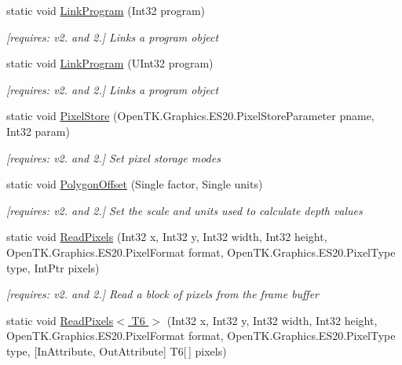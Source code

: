 \begin{DoxyCompactItemize}
static void \hyperlink{class_open_t_k_1_1_graphics_1_1_e_s20_1_1_g_l_a1c1b528b362544b485be4c741345638d}{Link\-Program} (Int32 program)
\begin{DoxyCompactList}\small\item\em \mbox{[}requires\-: v2. and 2.\mbox{]} Links a program object \end{DoxyCompactList}\item 
static void \hyperlink{class_open_t_k_1_1_graphics_1_1_e_s20_1_1_g_l_a133e0f78fdeb9901fceadc28635661be}{Link\-Program} (U\-Int32 program)
\begin{DoxyCompactList}\small\item\em \mbox{[}requires\-: v2. and 2.\mbox{]} Links a program object \end{DoxyCompactList}\item 
static void \hyperlink{class_open_t_k_1_1_graphics_1_1_e_s20_1_1_g_l_a249cdec32fb961d0bec2ab4993d53658}{Pixel\-Store} (Open\-T\-K.\-Graphics.\-E\-S20.\-Pixel\-Store\-Parameter pname, Int32 param)
\begin{DoxyCompactList}\small\item\em \mbox{[}requires\-: v2. and 2.\mbox{]} Set pixel storage modes \end{DoxyCompactList}\item 
static void \hyperlink{class_open_t_k_1_1_graphics_1_1_e_s20_1_1_g_l_a8c8fecc040e45858929ac47c3a6f1c9c}{Polygon\-Offset} (Single factor, Single units)
\begin{DoxyCompactList}\small\item\em \mbox{[}requires\-: v2. and 2.\mbox{]} Set the scale and units used to calculate depth values \end{DoxyCompactList}\item 
static void \hyperlink{class_open_t_k_1_1_graphics_1_1_e_s20_1_1_g_l_aa943fcfb6052e472d75861efc3c2a30c}{Read\-Pixels} (Int32 x, Int32 y, Int32 width, Int32 height, Open\-T\-K.\-Graphics.\-E\-S20.\-Pixel\-Format format, Open\-T\-K.\-Graphics.\-E\-S20.\-Pixel\-Type type, Int\-Ptr pixels)
\begin{DoxyCompactList}\small\item\em \mbox{[}requires\-: v2. and 2.\mbox{]} Read a block of pixels from the frame buffer \end{DoxyCompactList}\item 
static void \hyperlink{class_open_t_k_1_1_graphics_1_1_e_s20_1_1_g_l_a021f9426287d63831829d2983ed8c86f}{Read\-Pixels$<$ T6 $>$} (Int32 x, Int32 y, Int32 width, Int32 height, Open\-T\-K.\-Graphics.\-E\-S20.\-Pixel\-Format format, Open\-T\-K.\-Graphics.\-E\-S20.\-Pixel\-Type type, \mbox{[}In\-Attribute, Out\-Attribute\mbox{]} T6\mbox{[}$\,$\mbox{]} pixels)

\end{DoxyCompactItemize}
